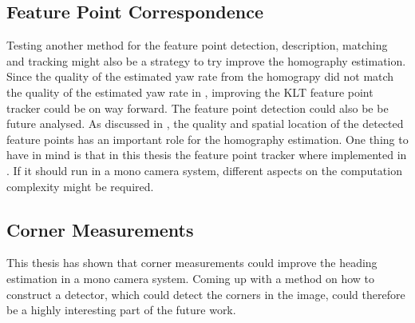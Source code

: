 \subsection{Feature Point Correspondence}
Testing another method for the feature point detection, description, matching and tracking might also be a strategy to try improve the homography estimation.
Since the quality of the estimated yaw rate from the homograpy did not match the quality of the estimated yaw rate in \cite{Gabb:2013}, improving the KLT feature point tracker could be on way forward.
The feature point detection could also be be future analysed.
As discussed in , the quality and spatial location of the detected feature points has an important role for the homography estimation.
One thing to have in mind is that in this thesis the feature point tracker where implemented in \matlab.
If it should run in a mono camera system, different aspects on the computation complexity might be required.

\subsection{Corner Measurements}
This thesis has shown that corner measurements could improve the heading estimation in a mono camera system.
Coming up with a method on how to construct a detector, which could detect the corners in the image, could therefore be a highly interesting part of the future work.
